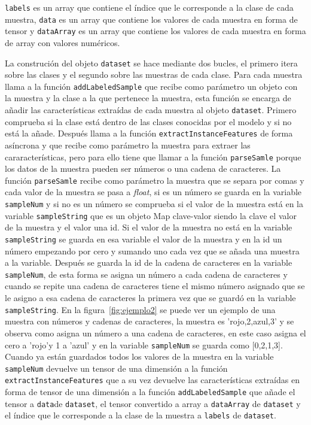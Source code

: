\documentclass[a4paper, 12pt]{book}
\begin{document}
\texttt{labels} es un array que contiene el índice que le corresponde a la clase de cada muestra, \texttt{data} es un array que contiene los valores de cada muestra en forma de tensor y \texttt{dataArray} es un array que contiene los valores de cada muestra en forma de array con valores numéricos.

La construción del objeto \texttt{dataset} se hace mediante dos bucles, el primero itera sobre las clases y el segundo sobre las muestras de cada clase. 
Para cada muestra llama a la función \texttt{addLabeledSample} que recibe como parámetro un objeto con la muestra y la clase a la que pertenece la muestra, esta función se encarga de añadir las características extraídas de cada muestra al objeto \texttt{dataset}. 
Primero comprueba si la clase está dentro de las clases conocidas por el modelo y si no está la añade. 
Después llama a la función \texttt{extractInstanceFeatures} de forma asíncrona y que recibe como parámetro la muestra para extraer las cararacterísticas, pero para ello tiene que llamar a la función \texttt{parseSamle} porque los datos de la muestra pueden ser números o una cadena de caracteres. 
La función \texttt{parseSamle} recibe como parámetro la muestra que se separa por comas y cada valor de la muestra se pasa a \emph{float}, si es un número se guarda en la variable \texttt{sampleNum} y si no es un número se comprueba si el valor de la muestra está en la variable \texttt{sampleString} que es un objeto Map clave-valor siendo la clave el valor de la muestra y el valor una id. 
Si el valor de la muestra no está en la variable \texttt{sampleString} se guarda en esa variable el valor de la muestra y en la id un número empezando por cero y sumando uno cada vez que se añada una muestra a la variable. 
Después se guarda la id de la cadena de caracteres en la variable \texttt{sampleNum}, de esta forma se asigna un número a cada cadena de caracteres y cuando se repite una cadena de caracteres tiene el mismo número asignado que se le asigno a esa cadena de caracteres la primera vez que se guardó en la variable \texttt{sampleString}. 
En la figura~\ref{fig:ejemplo2} se puede ver un ejemplo de una muestra con números y cadenas de caracteres, la muestra es 'rojo,2,azul,3' y se observa como asigna un número a una cadena de caracteres, en este caso asigna el cero a 'rojo'y 1 a 'azul' y en la variable \texttt{sampleNum} se guarda como [0,2,1,3]. 
Cuando ya están guardados todos los valores de la muestra en la variable \texttt{sampleNum} devuelve un tensor de una dimensión a la función \texttt{extractInstanceFeatures} que a su vez devuelve las características extraídas en forma de tensor de una dimensión a la función \texttt{addLabeledSample} que añade el tensor a \texttt{data}de \texttt{dataset}, el tensor convertido a array a \texttt{dataArray} de \texttt{dataset} y el índice que le corresponde a la clase de la muestra a \texttt{labels} de \texttt{dataset}.
\end{document}
